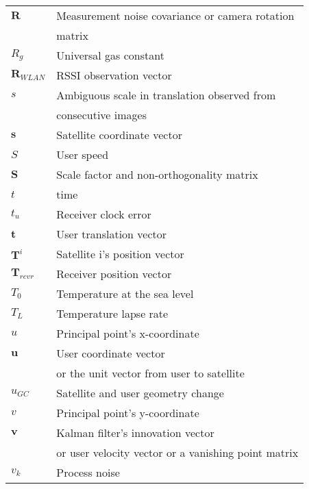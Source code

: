\begin{tabular}{l@{\hspace{3cm}}l}
\setlength{\tabcolsep}{50mm}
$\mathbf R$ & Measurement noise covariance or camera rotation\\[0.5ex]
{} &  matrix\\[2.0ex]
$R_g$ & Universal gas constant\\[2.0ex]
$\mathbf{R}_{WLAN}$ & RSSI observation vector\\[2.0ex]
$s$ & Ambiguous scale in translation observed from\\[0.5ex]
{} & consecutive images\\[2.0ex]
$\mathbf s$ & Satellite coordinate vector\\[2.0ex]
$S$ & User speed\\[2.0ex]
$\mathbf S$ & Scale factor and non-orthogonality matrix\\[2.0ex]
$t$ & time\\[2.0ex]
$t_u$ & Receiver clock error\\[2.0ex]
$\mathbf t$ & User translation vector\\[2.0ex]
$\mathbf T^i$ &Satellite i's position vector \\[2.0ex]
$\mathbf T_{rcvr}$ &Receiver position vector \\[2.0ex]
$T_0$ & Temperature at the sea level\\[2.0ex]
$T_L$ & Temperature lapse rate\\[2.0ex]
$u$ & Principal point's x-coordinate\\[2.0ex]
$\mathbf u$ & User coordinate vector\\[0.5ex]
{} & or the unit vector from user to satellite\\[2.0ex]
$u_{GC}$ & Satellite and user geometry change\\[2.0ex]
$v$ & Principal point's y-coordinate\\[2.0ex]
$\mathbf v$ & Kalman filter's innovation vector\\[0.5ex]
{} &  or user velocity vector or a vanishing point matrix\\[2.0ex]
$v_k$ & Process noise\\[2.0ex]
\end{tabular}
\newpage
